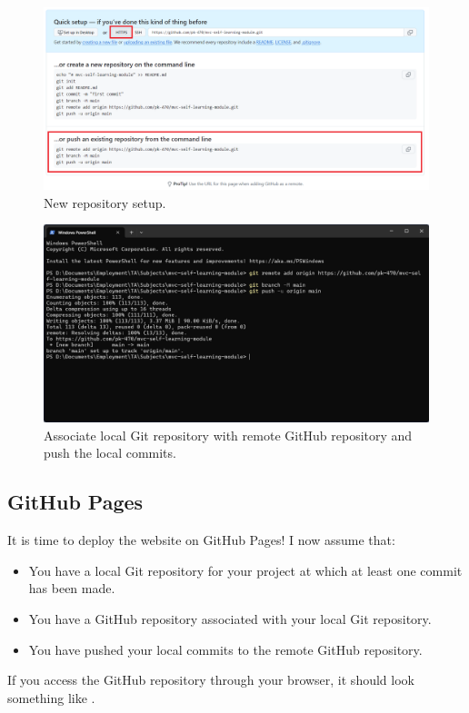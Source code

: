 \documentclass[a4paper,10pt]{article}
\begin{document}
\begin{figure}[htbp]
    \centering
    \includegraphics[width=\textwidth]{new_repository_setup.png}
    \caption{New repository setup.}
    \label{fig:new_repository_setup}   
\end{figure}

\begin{figure}[htbp]
    \centering
    \includegraphics[width=\textwidth]{git_remote_add_origin.png}
    \caption{Associate local Git repository with remote GitHub repository and push the local commits.}
    \label{fig:git_remote_add_origin}   
\end{figure}

\subsection{GitHub Pages}

It is time to deploy the website on GitHub Pages! I now assume that:
\begin{itemize}
    \item You have a local Git repository for your project at which at least one commit has been made.
    \item You have a GitHub repository associated with your local Git repository.
    \item You have pushed your local commits to the remote GitHub repository.
\end{itemize}
If you access the GitHub repository through your browser, it should look something like .
\end{document}
